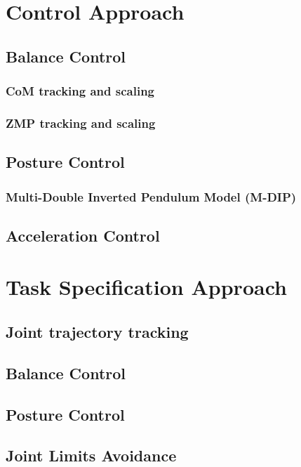 \section{Control Approach}
\subsection{Balance Control}
\subsubsection{CoM tracking and scaling}
\subsubsection{ZMP tracking and scaling}

\subsection{Posture Control}
\subsubsection{Multi-Double Inverted Pendulum Model (M-DIP)}
\subsection{Acceleration Control}

\section{Task Specification Approach}

\subsection{Joint trajectory tracking}
\subsection{Balance Control}
\subsection{Posture Control}
\subsection{Joint Limits Avoidance}
